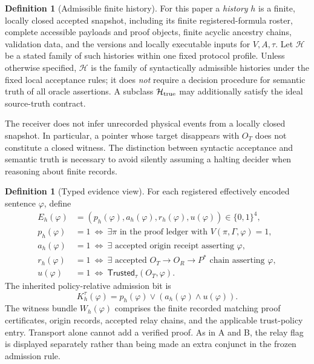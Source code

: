 \documentclass[11pt,letterpaper]{article}
\theoremstyle{definition}
\newtheorem{definition}[theorem]{Definition}
\newcommand{\Hh}{\mathcal H}
\newcommand{\Tr}{\mathsf{Trusted}}
\begin{document}
\begin{definition}[Admissible finite history]
For this paper a \emph{history} $h$ is a finite, locally closed accepted snapshot, including its finite registered-formula roster, complete accessible payloads and proof objects, finite acyclic ancestry chains, validation data, and the versions and locally executable inputs for $V,A,\tau$. Let $\Hh$ be a stated family of such histories within one fixed protocol profile. Unless otherwise specified, $\Hh$ is the family of syntactically admissible histories under the fixed local acceptance rules; it does \emph{not} require a decision procedure for semantic truth of all oracle assertions. A subclass $\Hh_{\rm true}$ may additionally satisfy the ideal source-truth contract.
\end{definition}

The receiver does not infer unrecorded physical events from a locally closed snapshot. In particular, a pointer whose target disappears with $O_T$ does not constitute a closed witness. The distinction between syntactic acceptance and semantic truth is necessary to avoid silently assuming a halting decider when reasoning about finite records.

\begin{definition}[Typed evidence view]
For each registered effectively encoded sentence $\varphi$, define
\begin{align*}
E_h(\varphi)&=(p_h(\varphi),a_h(\varphi),r_h(\varphi),u(\varphi))\in\{0,1\}^4,\\
p_h(\varphi)&=1\ \Longleftrightarrow\ \exists\pi\text{ in the proof ledger with }V(\pi,\Gamma,\varphi)=1,\\
a_h(\varphi)&=1\ \Longleftrightarrow\ \exists\text{ accepted origin receipt asserting }\varphi,\\
r_h(\varphi)&=1\ \Longleftrightarrow\ \exists\text{ accepted }O_T\to O_R\to P^*\text{ chain asserting }\varphi,\\
u(\varphi)&=1\ \Longleftrightarrow\ \Tr_\tau(O_T,\varphi).
\end{align*}
The inherited policy-relative admission bit is
\[
K_h^\tau(\varphi)=p_h(\varphi)\lor(a_h(\varphi)\land u(\varphi)).
\]
The witness bundle $W_h(\varphi)$ comprises the finite recorded matching proof certificates, origin records, accepted relay chains, and the applicable trust-policy entry. Transport alone cannot add a verified proof. As in A and B, the relay flag is displayed separately rather than being made an extra conjunct in the frozen admission rule.
\end{definition}
\end{document}
